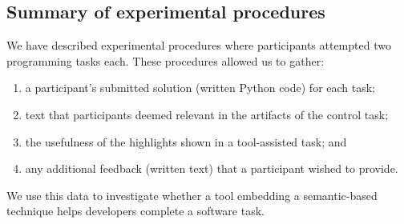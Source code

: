


\subsection{Summary of experimental procedures}


We have described experimental procedures 
where participants attempted two programming tasks each.
These procedures allowed us to gather:


\begin{enumerate}
\item a participant's submitted solution (written Python code) for each task;
\item text that participants deemed relevant in the artifacts of the control task;
\item the usefulness of the highlights shown in a tool-assisted task; and
\item any additional feedback (written text) that a participant wished to provide.
\end{enumerate}


We use this data to investigate whether 
a tool embedding a semantic-based technique helps developers complete a software task. 





